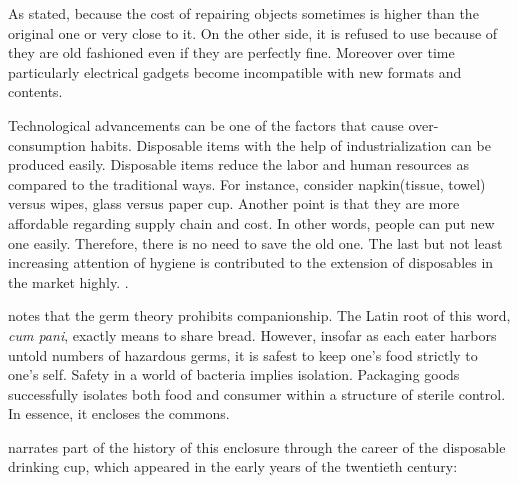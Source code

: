 As stated,  \citep[viii]{hawkins2005ethics} because the cost of repairing objects sometimes is higher than the original one or very close to it. On the other side, it is refused to use because of they are old fashioned even if they are perfectly fine. Moreover over time particularly electrical gadgets become incompatible with new formats and contents.

Technological advancements can be one of the factors that cause over-consumption habits. Disposable items with the help of industrialization can be produced easily. Disposable items reduce the labor and human resources as compared to the traditional ways. For instance, consider napkin(tissue, towel) versus wipes, glass versus paper cup. Another point is that they are more affordable regarding supply chain and cost. In other words, people can put new one easily. Therefore, there is no need to save the old one. The last but not least increasing attention of hygiene is contributed to the extension of disposables in the market highly.  \citep[70]{kennedy2007ontology}. 


\cite{kennedy2007ontology} notes that the germ theory prohibits companionship. The Latin root of this word, \textit{cum pani}, exactly means to share bread. However, insofar as each eater harbors untold numbers of hazardous germs, it is safest to keep one’s food strictly to one’s self. Safety in a world of bacteria implies isolation. Packaging goods successfully isolates both food and consumer within a structure of sterile control. In essence, it encloses the commons.

\citep[176--177]{strasser1999waste} narrates part of the history of this enclosure through the career of the disposable drinking cup, which appeared in the early years of the twentieth century:

